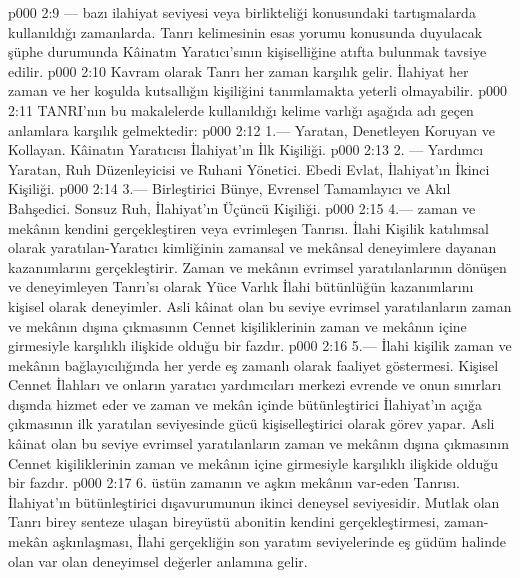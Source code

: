 \vs p000 2:9 --- bazı ilahiyat seviyesi veya birlikteliği konusundaki tartışmalarda kullanıldığı zamanlarda. Tanrı kelimesinin esas yorumu konusunda duyulacak şüphe durumunda Kâinatın Yaratıcı’sının kişiselliğine atıfta bulunmak tavsiye edilir.
\vs p000 2:10 Kavram olarak Tanrı her zaman  karşılık gelir. İlahiyat her zaman ve her koşulda kutsallığın kişiliğini tanımlamakta yeterli olmayabilir.
\vs p000 2:11 TANRI’nın bu makalelerde kullanıldığı kelime varlığı aşağıda adı geçen anlamlara karşılık gelmektedir:
\vs p000 2:12 1.\bibnobreakspace {}--- Yaratan, Denetleyen Koruyan ve Kollayan. Kâinatın Yaratıcısı İlahiyat’ın İlk Kişiliği.
\vs p000 2:13 2.\bibnobreakspace {} --- Yardımcı Yaratan, Ruh Düzenleyicisi ve Ruhani Yönetici. Ebedi Evlat, İlahiyat’ın İkinci Kişiliği.
\vs p000 2:14 3.\bibnobreakspace {}--- Birleştirici Bünye, Evrensel Tamamlayıcı ve Akıl Bahşedici. Sonsuz Ruh, İlahiyat’ın Üçüncü Kişiliği.
\vs p000 2:15 4.\bibnobreakspace {}--- zaman ve mekânın kendini gerçekleştiren veya evrimleşen Tanrısı. İlahi Kişilik katılımsal olarak yaratılan\hyp{}Yaratıcı kimliğinin zamansal ve mekânsal deneyimlere dayanan kazanımlarını gerçekleştirir. Zaman ve mekânın evrimsel yaratılanlarının dönüşen ve deneyimleyen Tanrı’sı olarak Yüce Varlık İlahi bütünlüğün kazanımlarını kişisel olarak deneyimler. Asli kâinat olan bu seviye evrimsel yaratılanların zaman ve mekânın dışına çıkmasının Cennet kişiliklerinin zaman ve mekânın içine girmesiyle karşılıklı ilişkide olduğu bir fazdır.
\vs p000 2:16 5.\bibnobreakspace {}--- İlahi kişilik zaman ve mekânın bağlayıcılığında her yerde eş zamanlı olarak faaliyet göstermesi. Kişisel Cennet İlahları ve onların yaratıcı yardımcıları merkezi evrende ve onun sınırları dışında hizmet eder ve zaman ve mekân içinde bütünleştirici İlahiyat’ın açığa çıkmasının ilk yaratılan seviyesinde gücü kişiselleştirici olarak görev yapar. Asli kâinat olan bu seviye evrimsel yaratılanların zaman ve mekânın dışına çıkmasının Cennet kişiliklerinin zaman ve mekânın içine girmesiyle karşılıklı ilişkide olduğu bir fazdır.
\vs p000 2:17 6.\bibnobreakspace {} üstün zamanın ve aşkın mekânın var\hyp{}eden Tanrısı. İlahiyat’ın bütünleştirici dışavurumunun ikinci deneysel seviyesidir. Mutlak olan Tanrı birey senteze ulaşan bireyüstü abonitin kendini gerçekleştirmesi, zaman\hyp{}mekân aşkınlaşması, İlahi gerçekliğin son yaratım seviyelerinde eş güdüm halinde olan var olan deneyimsel değerler anlamına gelir.
